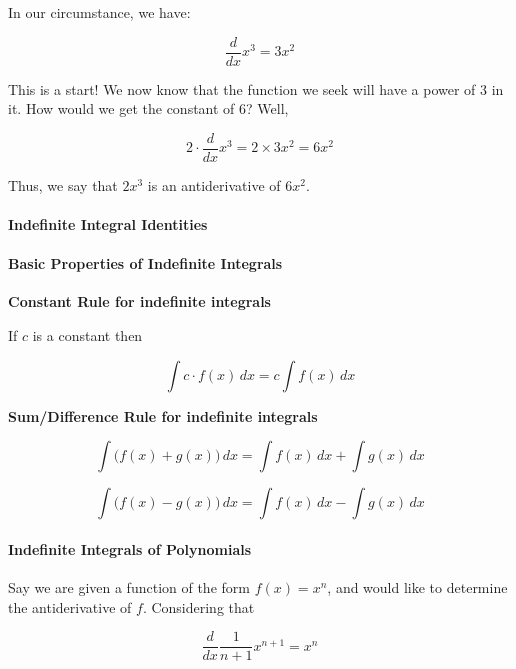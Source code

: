 In our circumstance, we have:



$$\frac{d}{dx} x^3 = 3x^2$$



This is a start! We now know that the function we seek will have a power of 3 in it. How would we get the constant of 6? Well,



$$2 \cdot \frac{d}{dx} x^3 = 2 \times 3x^2 = 6x^2$$ 



Thus, we say that $2x^3$ is an antiderivative of $6x^2$.



\paragraph{Indefinite Integral Identities}



\paragraph{Basic Properties of Indefinite Integrals}



\textbf{Constant Rule for indefinite integrals}  

If $c$ is a constant then



$$\int c \cdot f(x) \, dx = c \int f(x) \, dx$$



\textbf{Sum/Difference Rule for indefinite integrals}  



$$\int \Big(f(x) + g(x)\Big) \, dx = \int f(x) \, dx + \int g(x) \, dx$$



$$\int \Big(f(x) - g(x)\Big) \, dx = \int f(x) \, dx - \int g(x) \, dx$$



\paragraph{Indefinite Integrals of Polynomials}



Say we are given a function of the form $f(x) = x^n$, and would like to determine the antiderivative of $f$. Considering that



$$\frac{d}{dx} \frac{1}{n+1} x^{n+1} = x^n$$




